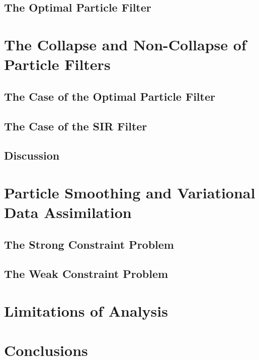 \subsection{The Optimal Particle Filter}
\label{chorin:particle:optimal}

\section{The Collapse and Non-Collapse of Particle Filters}
\label{chorin:collapse}

\subsection{The Case of the Optimal Particle Filter}
\label{chorin:collapse:optimal}

\subsection{The Case of the SIR Filter}
\label{chorin:collapse:sir}

\subsection{Discussion}
\label{chorin:collapse:discussion}

\section{Particle Smoothing and Variational Data Assimilation}
\label{chorin:smoothing}

\subsection{The Strong Constraint Problem}
\label{chorin:smoothing:strong_constraint}

\subsection{The Weak Constraint Problem}
\label{chorin:smoothing:weak_constraint}

\section{Limitations of Analysis}
\label{chorin:limitations}

\section{Conclusions}
\label{chorin:conclusions}


